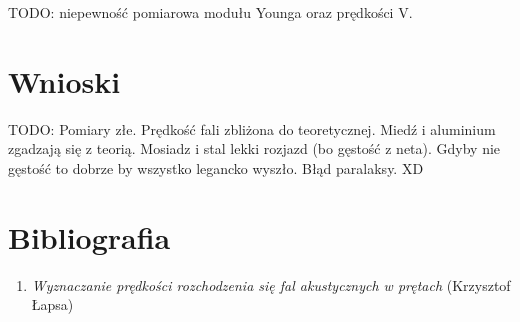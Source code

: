 \documentclass[polish, a4paper]{article}
\begin{document}
TODO: niepewność pomiarowa modułu Younga oraz prędkości V.

\section{Wnioski}

TODO: Pomiary złe. Prędkość fali zbliżona do teoretycznej. Miedź i aluminium zgadzają się z teorią. Mosiadz i stal lekki rozjazd (bo gęstość z neta). Gdyby nie gęstość to dobrze by wszystko legancko wyszło. Błąd paralaksy. XD 

\section{Bibliografia}

\begin{enumerate}
    \item {\emph{Wyznaczanie prędkości rozchodzenia się fal akustycznych w prętach } (Krzysztof Łapsa)}
\end{enumerate}
\end{document}
